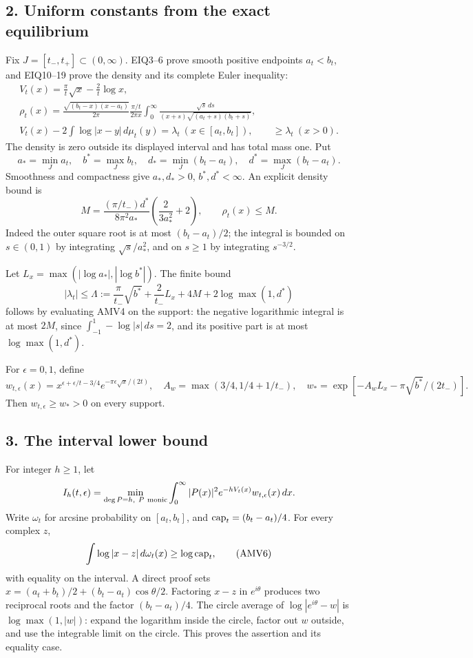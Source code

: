 \documentclass[11pt]{article}
\begin{document}
\subsection{2. Uniform constants from the exact equilibrium}\label{uniform-constants-from-the-exact-equilibrium}

Fix \(J=[t_-,t_+]\subset(0,\infty)\). EIQ3--6 prove smooth positive endpoints \(a_t<b_t\), and EIQ10--19 prove the density and its complete Euler inequality: \[
\begin{gathered}
V_t(x)=\frac{\pi}{t}\sqrt x-\frac2t\log x,\\
\rho_t(x)=\frac{\sqrt{(b_t-x)(x-a_t)}}{2\pi}
\frac{\pi/t}{2\pi x}
\int_0^\infty\frac{\sqrt s\,ds}{(x+s)\sqrt{(a_t+s)(b_t+s)}},\\
V_t(x)-2\int\log|x-y|\,d\mu_t(y)
=\lambda_t\ (x\in[a_t,b_t]),\qquad
\ge\lambda_t\ (x>0).
\end{gathered}\tag{AMV4}
\] The density is zero outside its displayed interval and has total mass one. Put \[
a_*=\min_Ja_t,\quad b^*=\max_Jb_t,\quad
d_*=\min_J(b_t-a_t),\quad d^*=\max_J(b_t-a_t).
\] Smoothness and compactness give \(a_*,d_*>0\), \(b^*,d^*<\infty\). An explicit density bound is \[
M=\frac{(\pi/t_-)d^*}{8\pi^2a_*}
\left(\frac{2}{3a_*^2}+2\right),\qquad \rho_t(x)\le M.
\tag{AMV5}
\] Indeed the outer square root is at most \((b_t-a_t)/2\); the integral is bounded on \(s\in(0,1)\) by integrating \(\sqrt s/a_*^2\), and on \(s\ge1\) by integrating \(s^{-3/2}\).

Let \(L_x=\max(|\log a_*|,|\log b^*|)\). The finite bound \[
|\lambda_t|\le\Lambda:=\frac{\pi}{t_-}\sqrt{b^*}
+\frac2{t_-}L_x+4M+2\log\max(1,d^*)
\] follows by evaluating AMV4 on the support: the negative logarithmic integral is at most \(2M\), since \(\int_{-1}^1-\log|s|\,ds=2\), and its positive part is at most \(\log\max(1,d^*)\).

For \(\epsilon=0,1\), define \[
w_{t,\epsilon}(x)=x^{\epsilon+\epsilon/t-3/4}
e^{-\pi\epsilon\sqrt x/(2t)},\quad
A_w=\max(3/4,1/4+1/t_-),\quad
w_*=\exp[-A_wL_x-\pi\sqrt{b^*}/(2t_-)].
\] Then \(w_{t,\epsilon}\ge w_*>0\) on every support.

\subsection{3. The interval lower bound}\label{the-interval-lower-bound}

For integer \(h\ge1\), let \[
I_h(t,\epsilon)=\min_{\deg P=h,\ P\ {\rm monic}}
\int_0^\infty |P(x)|^2e^{-hV_t(x)}w_{t,\epsilon}(x)\,dx.
\] Write \(\omega_t\) for arcsine probability on \([a_t,b_t]\), and \({\rm cap}_t=(b_t-a_t)/4\). For every complex \(z\), \[
\int\log|x-z|\,d\omega_t(x)\ge\log{\rm cap}_t,
\tag{AMV6}
\] with equality on the interval. A direct proof sets \(x=(a_t+b_t)/2+(b_t-a_t)\cos\theta/2\). Factoring \(x-z\) in \(e^{i\theta}\) produces two reciprocal roots and the factor \((b_t-a_t)/4\). The circle average of \(\log|e^{i\theta}-w|\) is \(\log\max(1,|w|)\): expand the logarithm inside the circle, factor out \(w\) outside, and use the integrable limit on the circle. This proves the assertion and its equality case.
\end{document}
